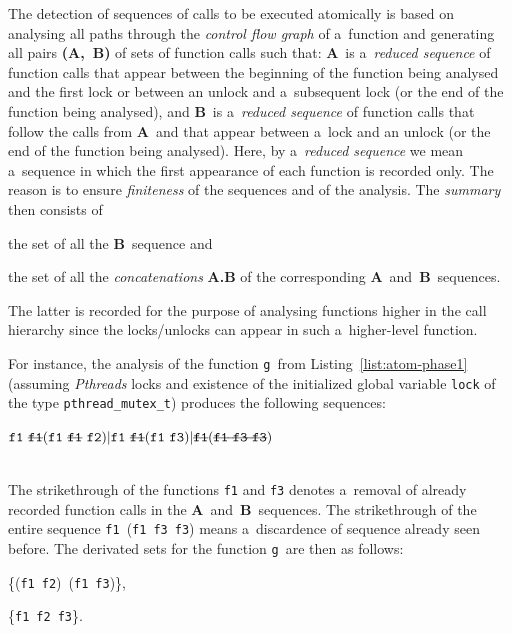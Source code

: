 \documentclass{ExcelAtFIT}
\begin{document}
The detection of sequences of calls to be
executed atomically is based on analysing all
paths through the \emph{control flow graph} of
a~function and generating all pairs
\textbf{(A,~B)} of sets of function
calls such that: \textbf{A}~is a~\emph{reduced
sequence} of function calls that appear
between the beginning of the function being
analysed and the first lock or between an
unlock and a~subsequent lock (or the end of the
function being analysed), and
\textbf{B}~is a~\emph{reduced sequence} of function
calls that follow the calls from
\textbf{A}~and that appear between a~lock
and an unlock (or the end of the function
being analysed). Here, by a~\emph{reduced sequence}
we mean a~sequence in which the first
appearance of each function is recorded only.
The reason is to ensure \emph{finiteness} of the
sequences and of the analysis. The \emph{summary}
then consists of
\begin{enumerate*}[label={(\roman*)}]
    \item
        the set of all the \textbf{B}~sequence
        and

    \item
        the set of all the \emph{concatenations}
        \textbf{A.B} of the corresponding
        \textbf{A}~and~\textbf{B}~sequences.
\end{enumerate*}
The latter is recorded for the purpose of
analysing functions higher in the call
hierarchy since the locks/unlocks can appear
in such a~higher-level function.

For instance, the analysis of the
function \texttt{g}~from
Listing~\ref{list:atom-phase1} (assuming
\emph{Pthreads} locks and existence of the
initialized global variable \texttt{lock} of
the type \texttt{pthr\-ead\_mutex\_t})
produces the following sequences:
\\[0.4em]
\centerline{$
    \text{\texttt{f1} \sout{\texttt{f1}}}
    (\text{\texttt{f1} \sout{\texttt{f1}} \texttt{f2}}) |
    \text{\texttt{f1} \sout{\texttt{f1}}}
    (\text{\texttt{f1} \texttt{f3}}) |
    \text{\sout{\texttt{f1}}}
    (\text{\sout{\texttt{f1} \texttt{f3} \texttt{f3}}})
$}
\\[0.4em]
The strikethrough of the functions \texttt{f1}
and \texttt{f3} denotes a~removal of
already recorded function calls in the
\textbf{A}~and~\textbf{B}~sequences.
The strikethrough of the entire sequence
\texttt{f1}~(\texttt{f1}~\texttt{f3}~\texttt{f3})
means a~discardence of sequence already
seen before.
The derivated sets for the
function \texttt{g}~are then as follows:
\begin{enumerate*}[label={(\roman*)}, topsep=0.4em]
    \item
       \{(\texttt{f1}~\texttt{f2})~(\texttt{f1}~\texttt{f3})\},

    \item
        \{\texttt{f1}~\texttt{f2}~\texttt{f3}\}.
\end{enumerate*}
\end{document}
